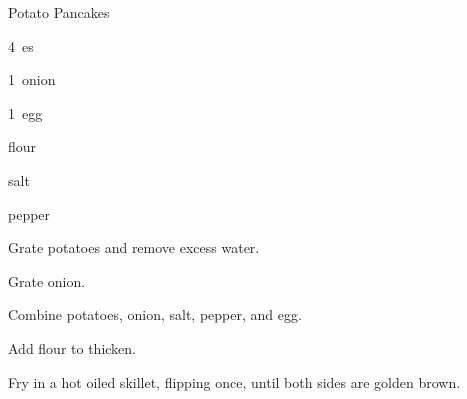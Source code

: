 \begin{recipe}{Potato Pancakes}{}{}

\begin{ingredients}
\item 4~es
\item 1~onion
\item 1~egg
\item flour
\item salt
\item pepper
\end{ingredients}

\begin{directions}
\item Grate potatoes and remove excess water.
\item Grate onion.
\item Combine potatoes, onion, salt, pepper, and egg.
\item Add flour to thicken.
\item Fry in a hot oiled skillet, flipping once, until both sides are golden brown.
\end{directions}

\end{recipe}
